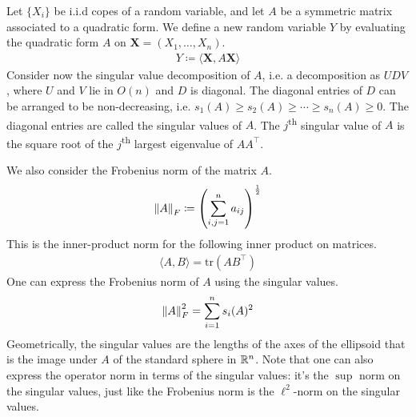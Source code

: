 \documentclass[11pt]{article}
\begin{document}
Let $\{X_i\}$ be i.i.d copes of a random variable, and let $A$ be a symmetric matrix associated to a quadratic form.
We define a new random variable $Y$ by evaluating the quadratic form $A$ on $\mathbf{X} = \left( X_1, \ldots, X_n \right)$.
\begin{align*}
  Y \coloneqq \langle \mathbf{X}, A\mathbf{X} \rangle
\end{align*}
Consider now the singular value decomposition of $A$, i.e. a decomposition as $UDV$, where $U$ and $V$ lie in $O(n)$ and $D$ is diagonal.
The diagonal entries of $D$ can be arranged to be non-decreasing, i.e. $s_1(A) \geq s_2(A) \geq \cdots \geq s_n(A) \geq 0$.
The diagonal entries are called the singular values of $A$.
The $j$\textsuperscript{th} singular value of $A$ is the square root of the $j$\textsuperscript{th} largest eigenvalue of $AA^{\top}$.

We also consider the Frobenius norm of the matrix $A$.
\begin{align*}
  \left\lVert A\right\rVert_F \coloneqq \left( \sum_{i,j=1}^n a_{ij} \right)^{\frac{1}{2}}
\end{align*}
This is the inner-product norm for the following inner product on matrices.
\begin{align*}
  \langle A, B \rangle = \mathrm{tr}(AB^{\top})
\end{align*}
One can express the Frobenius norm of $A$ using the singular values.
\begin{align*}
  \left\lVert A\right\rVert_F^2 = \sum_{i=1}^{n} s_i(A)^2
\end{align*}
Geometrically, the singular values are the lengths of the axes of the ellipsoid that is the image under $A$ of the standard sphere in $\mathbb{R}^n$.
Note that one can also express the operator norm in terms of the singular values: it's the $\sup$ norm on the singular values, just like the Frobenius norm is the $\ell^2$-norm on the singular values.
\end{document}
